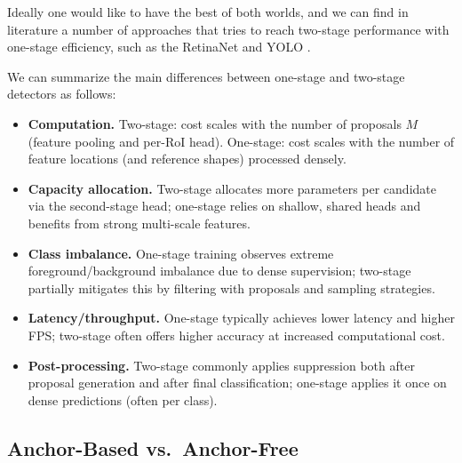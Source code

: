 Ideally one would like to have the best of both worlds, and we can find in literature a number of approaches that tries to reach two-stage performance with one-stage efficiency, such as the RetinaNet and YOLO \cite{lin2018focalloss,redmon2016yolo}.

We can summarize the main differences between one-stage and two-stage detectors as follows:
\begin{itemize}
    \item \textbf{Computation.} Two-stage: cost scales with the number of proposals $M$ (feature pooling and per-RoI head). One-stage: cost scales with the number of feature locations (and reference shapes) processed densely.
    \item \textbf{Capacity allocation.} Two-stage allocates more parameters per candidate via the second-stage head; one-stage relies on shallow, shared heads and benefits from strong multi-scale features.
    \item \textbf{Class imbalance.} One-stage training observes extreme foreground/background imbalance due to dense supervision; two-stage partially mitigates this by filtering with proposals and sampling strategies.
    \item \textbf{Latency/throughput.} One-stage typically achieves lower latency and higher FPS; two-stage often offers higher accuracy at increased computational cost.
    \item \textbf{Post-processing.} Two-stage commonly applies suppression both after proposal generation and after final classification; one-stage applies it once on dense predictions (often per class).
\end{itemize}




\subsection{Anchor-Based vs.\ Anchor-Free}

